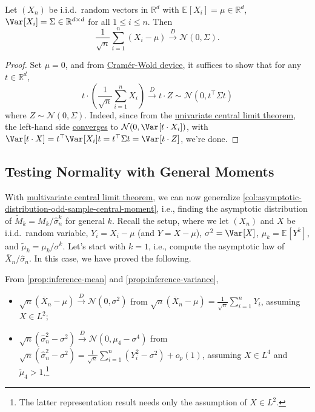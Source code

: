 \begin{theorem}\label{thm:multivariate-CLT}
	Let \((X_n)\) be i.i.d.\ random vectors in \(\mathbb{R} ^d\) with \(\mathbb{E}_{}[X_i] = \mu \in \mathbb{R} ^d\), \(\Var_{}[X_i] = \Sigma \in \mathbb{R} ^{d \times d}\) for all \(1 \leq i \leq n\). Then
	\[
		\frac{1}{\sqrt{n} } \sum_{i=1}^{n} (X_i - \mu )
		\overset{D}{\to} \mathcal{N} (0, \Sigma ).
	\]
\end{theorem}
\begin{proof}
	Set \(\mu = 0\), and from \hyperref[thm:Cramer-Wold-device]{Cramér-Wold device}, it suffices to show that for any \(t \in \mathbb{R} ^d\),
	\[
		t \cdot \left( \frac{1}{\sqrt{n} } \sum_{i=1}^{n} X_i \right)
		\overset{D}{\to} t \cdot Z
		\sim \mathcal{N} (0, t ^{\top} \Sigma t)
	\]
	where \(Z \sim \mathcal{N} (0, \Sigma )\). Indeed, since from the \hyperref[thm:CLT]{univariate central limit theorem}, the left-hand side \hyperref[def:converge-in-distribution]{converges} to \(\mathcal{N} (0, \Var_{}[t\cdot X_i] )\), with \(\Var_{}[t \cdot X] = t^{\top} \Var_{}[X_i] t = t ^{\top} \Sigma t = \Var_{}[t \cdot Z] \), we're done.
\end{proof}

\subsection{Testing Normality with General Moments}
With \hyperref[thm:multivariate-CLT]{multivariate central limit theorem}, we can now generalize \autoref{col:asymptotic-distribution-odd-sample-central-moment}, i.e., finding the asymptotic distribution of \(\widetilde{M} _k = M_k / \hat{\sigma} _n^k\) for general \(k\). Recall the setup, where we let \((X_n)\) and \(X\) be i.i.d.\ random variable, \(Y_i = X_i - \mu \) (and \(Y = X - \mu \)), \(\sigma ^2 = \Var_{}[X] \), \(\mu _k = \mathbb{E}_{}[Y^k] \), and \(\widetilde{\mu} _k = \mu _k / \sigma ^k\). Let's start with \(k = 1\), i.e., compute the asymptotic law of \(\overline{X} _n / \hat{\sigma} _n\). In this case, we have proved the following.

\begin{prev}
	From \autoref{prop:inference-mean} and \autoref{prop:inference-variance},
	\begin{itemize}
		\item \(\sqrt{n} (\overline{X} _n - \mu ) \overset{D}{\to} \mathcal{N} (0, \sigma ^2)\) from \(\sqrt{n} (\overline{X} _n - \mu ) = \frac{1}{\sqrt{n} } \sum_{i=1}^{n} Y_i\), assuming \(X \in L^2\);
		\item \(\sqrt{n} (\hat{\sigma} _n^2 - \sigma ^2) \overset{D}{\to} \mathcal{N} (0, \mu _4 - \sigma ^4) \) from \(\sqrt{n} (\hat{\sigma} _n^2 - \sigma ^2) = \frac{1}{\sqrt{n} } \sum_{i=1}^{n} (Y_i^2 - \sigma ^2) + o_p(1)\), assuming \(X \in L^4\) and \(\widetilde{\mu} _4 > 1\).\footnote{The latter representation result needs only the assumption of \(X \in L^2\).}
	\end{itemize}
\end{prev}

